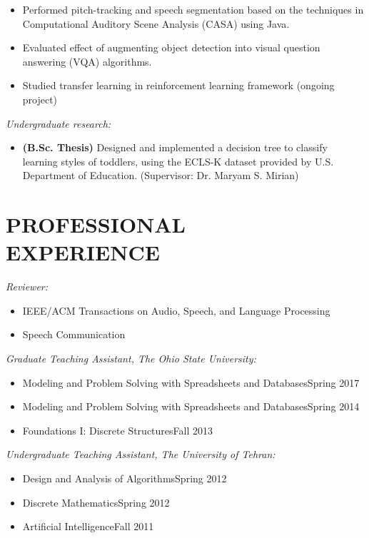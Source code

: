 \documentclass[margin, 10pt]{res}
\begin{document}
\begin{resume}
\begin{itemize}
\item Performed pitch-tracking and speech segmentation based on the techniques in Computational Auditory Scene Analysis (CASA) using Java.
\item Evaluated effect of augmenting object detection into visual question answering (VQA) algorithms.
\item Studied transfer learning in reinforcement learning framework (ongoing project)

\end{itemize}

\textit{Undergraduate research:}
\begin{itemize}
\item \textbf{(B.Sc. Thesis)} Designed and implemented a decision tree to classify learning styles of toddlers, using the ECLS-K dataset provided by U.S. Department of Education. (Supervisor: Dr. Maryam S. Mirian)
\end{itemize}

\section{PROFESSIONAL \\ EXPERIENCE}
\textit{Reviewer:}
\begin{itemize}
\item IEEE/ACM Transactions on Audio, Speech, and Language Processing
\item Speech Communication
\end{itemize}

\textit{Graduate Teaching Assistant, The Ohio State University:}
\begin{itemize}
\item Modeling and Problem Solving with Spreadsheets and Databases\hfill {\footnotesize Spring 2017}
\item Modeling and Problem Solving with Spreadsheets and Databases\hfill {\footnotesize Spring 2014}
\item Foundations I: Discrete Structures\hfill {\footnotesize Fall 2013}
\end{itemize}
\textit{Undergraduate Teaching Assistant, The University of Tehran:}
\begin{itemize}
\item Design and Analysis of Algorithms\hfill {\footnotesize Spring 2012}
\item Discrete Mathematics\hfill {\footnotesize Spring 2012}
\item Artificial Intelligence\hfill {\footnotesize Fall 2011}
\end{itemize}




\end{resume}
\end{document}
